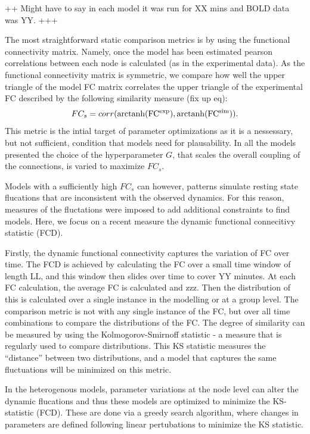 \documentclass[oneside]{zHenriquesLab-StyleBioRxiv}
\begin{document}
++ Might have to say in each model it was run for XX mins and BOLD data was YY. +++ 

The most straightforward static comparison metrics is by using the functional connectivity matrix. Namely, once the model has been estimated pearson correlations between each node is calculated (as in the experimental data). As the functional connectivity matrix is symmetric, we compare how well the upper triangle of the model FC matrix correlates the upper triangle of the experimental FC described by the following similarity measure (fix up eq):
\begin{equation}
	FC_{s} = corr({\rm arctanh(FC^{exp}}),{\rm arctanh(FC^{sim}})).
\end{equation}
This metric is the intial target of parameter optimizations as it is a nessessary, but not sufficient, condition that models need for plausability. In all the models presented the choice of the hyperparameter $G$, that scales the overall coupling of the connections, is varied to maximize $FC_s$.  

Models with a sufficiently high $FC_s$ can however, patterns simulate resting state flucations that are inconsistent with the observed dynamics. For this reason, measures of the fluctations were imposed to add additional constraints to find models. Here, we focus on a recent measure the dynamic functional connecitivy statistic (FCD).

Firstly, the dynamic functional connectivity captures the variation of FC over time. The FCD is achieved by calculating the FC over a small time window of length LL, and this window then slides over time to cover YY minutes. At each FC calculation, the average FC is calculated and zzz. Then the distribution of this is calculated over a single instance in the modelling or at a group level. The comparison metric is not with any single instance of the FC, but over all time combinations to compare the distributions of the FC. The degree of similarity can be measured by using the Kolmogorov-Smirnoff statistic - a measure that is regularly used to compare distributions. This KS statistic measures the ``distance'' between two distributions, and a model that captures the same fluctuations will be minimized on this metric. 

In the heterogenous models, parameter variations at the node level can alter the dynamic flucations and thus these models are optimized to minimize the KS-statistic (FCD). These are done via a greedy search algorithm, where changes in parameters are defined following linear pertubations to minimize the KS statistic. 
\end{document}
